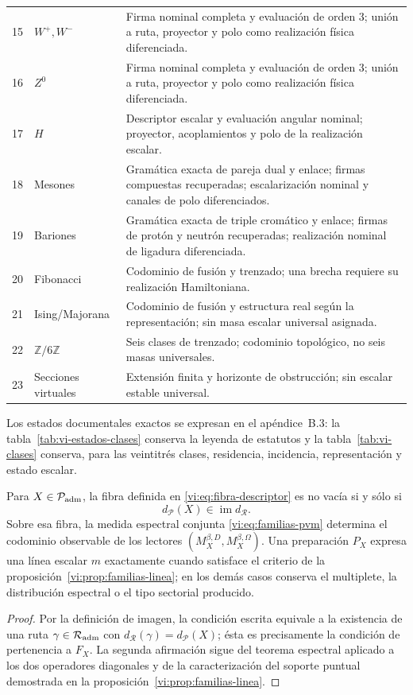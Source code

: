 \begin{table}[!htbp]
\begin{tabular}{@{}p{.11\linewidth}p{.20\linewidth}p{.62\linewidth}@{}}
 15&\(W^+,W^-\)&Firma nominal completa y evaluación de orden \(3\); unión a ruta, proyector y polo como realización física diferenciada.\\
 16&\(Z^0\)&Firma nominal completa y evaluación de orden \(3\); unión a ruta, proyector y polo como realización física diferenciada.\\
 17&\(H\)&Descriptor escalar y evaluación angular nominal; proyector, acoplamientos y polo de la realización escalar.\\
 18&Mesones&Gramática exacta de pareja dual y enlace; firmas compuestas recuperadas; escalarización nominal y canales de polo diferenciados.\\
 19&Bariones&Gramática exacta de triple cromático y enlace; firmas de protón y neutrón recuperadas; realización nominal de ligadura diferenciada.\\
 20&Fibonacci&Codominio de fusión y trenzado; una brecha requiere su realización Hamiltoniana.\\
 21&Ising/Majorana&Codominio de fusión y estructura real según la representación; sin masa escalar universal asignada.\\
 22&\(\mathbb Z/6\mathbb Z\)&Seis clases de trenzado; codominio topológico, no seis masas universales.\\
 23&Secciones virtuales&Extensión finita y horizonte de obstrucción; sin escalar estable universal.\\
\end{tabular}
\end{table}

Los estados documentales exactos se expresan en el apéndice~B.3: la
tabla~\ref{tab:vi-estados-clases} conserva la leyenda de estatutos y la
tabla~\ref{tab:vi-clases} conserva, para las veintitrés clases, residencia,
incidencia, representación y estado escalar.

\begin{proposition}
\label{vi:prop:producto-fibrado-especie-ruta}
Para \(X\in\mathcal P_{\rm adm}\), la fibra definida en
\eqref{vi:eq:fibra-descriptor} es no vacía si y sólo si
\[
 d_{\mathcal P}(X)\in\operatorname{im}d_{\mathcal R}.
\]
Sobre esa fibra, la medida espectral conjunta
\eqref{vi:eq:familias-pvm} determina el codominio observable de los lectores
\((M_X^{\beta,D},M_X^{\beta,\Omega})\). Una preparación \(P_X\) expresa una
línea escalar \(m\) exactamente cuando satisface el criterio de la
proposición~\ref{vi:prop:familias-linea}; en los demás casos conserva el
multiplete, la distribución espectral o el tipo sectorial producido.
\end{proposition}
\begin{proof}
Por la definición de imagen, la condición escrita equivale a la existencia de
una ruta \(\gamma\in\mathcal R_{\rm adm}\) con
\(d_{\mathcal R}(\gamma)=d_{\mathcal P}(X)\); ésta es precisamente la
condición de pertenencia a \(F_X\). La segunda afirmación sigue del teorema
espectral aplicado a los dos operadores diagonales y de la caracterización
del soporte puntual demostrada en la
proposición~\ref{vi:prop:familias-linea}.
\end{proof}

